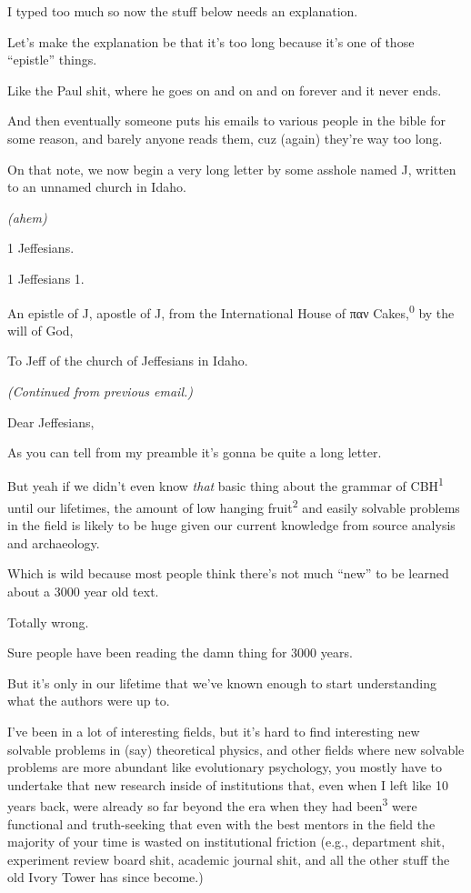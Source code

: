 
{ \hX{} }
{ \eX{} }
{
    I typed too much so now the stuff below needs an explanation.

    Let's make the explanation be that it's too long because it's one of those ``epistle'' things.

    Like the Paul shit, where he goes on and on and on forever and it never ends.

    And then eventually someone puts his emails to various people in the bible for some reason, and barely anyone reads them, cuz (again) they're way too long.
}

{ \hX{} }
{ \eX{} }
{
    On that note, we now begin a very long letter by some asshole named J, written to an unnamed church in Idaho.

    \emph{(ahem)}
}

{ \hX{} }
{ \eX{} }
{
    1 Jeffesians.

    1 Jeffesians 1.

    An epistle of J, apostle of J, from the International House of παν Cakes,\textsuperscript{0} by the will of God,

    To Jeff of the church of Jeffesians in Idaho.

    \emph{(Continued from previous email.)}
}

{ \hX{} }
{ \eX{} }
{
    Dear Jeffesians,

    As you can tell from my preamble it's gonna be quite a long letter.
}

{ \hX{} }
{ \eX{} }
{
    But yeah if we didn't even know \emph{that} basic thing about the grammar of CBH\textsuperscript{1} until our lifetimes, the amount of low hanging fruit\textsuperscript{2} and easily solvable problems in the field is likely to be huge given our current knowledge from source analysis and archaeology.
}

{ \hX{} }
{ \eX{} }
{
    Which is wild because most people think there's not much ``new'' to be learned about a 3000 year old text.

    Totally wrong.

    Sure people have been reading the damn thing for 3000 years.

    But it's only in our lifetime that we've known enough to start understanding what the authors were up to.
}

{ \hX{} }
{ \eX{} }
{
    I've been in a lot of interesting fields, but it's hard to find interesting new solvable problems in (say) theoretical physics, and other fields where new solvable problems are more abundant like evolutionary psychology, you mostly have to undertake that new research inside of institutions that, even when I left like 10 years back, were already so far beyond the era when they had been\textsuperscript{3} were functional and truth-seeking that even with the best mentors in the field the majority of your time is wasted on institutional friction (e.g., department shit, experiment review board shit, academic journal shit, and all the other stuff the old Ivory Tower has since become.)
}

